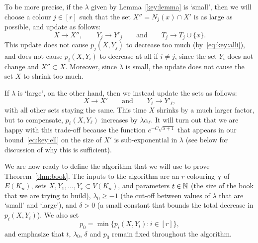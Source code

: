 To be more precise, if the $\lambda$ given by Lemma~\ref{key:lemma} is `small', then we will choose a colour $j \in [r]$ such that the set $X'' = N_j(x) \cap X'$ is as large as possible, and update as follows:
$$X \to X'', \qquad Y_j \to Y'_j \qquad \text{and} \qquad T_j \to T_j \cup \{x\}.$$
This update does not cause $p_j(X,Y_j)$ to decrease too much (by~\eqref{eq:key:alli}), and does not cause $p_i(X,Y_i)$ to decrease at all if $i \ne j$, since the set $Y_i$ does not change and $X'' \subset X$. Moreover, since $\lambda$ is small, the update does not cause the set $X$ to shrink too much. 

If $\lambda$ is `large', on the other hand, then we instead update the sets as follows:
$$X \to X' \qquad \text{and} \qquad Y_\ell \to Y'_\ell,$$
with all other sets staying the same. This time $X$ shrinks by a much larger factor, but to compensate, $p_\ell(X,Y_\ell)$ increases by $\lambda \alpha_\ell$. It will turn out that we are happy with this trade-off because the function $e^{- C \sqrt{\lambda + 1}}$ that appears in our bound~\eqref{eq:key:ell} on the size of $X'$ is sub-exponential in $\lambda$ (see below for discussion of why this is sufficient). 

We are now ready to define the algorithm that we will use to prove Theorem~\ref{thm:book}. The inputs to the algorithm are an $r$-colouring $\chi$ of $E(K_n)$, %
sets $X,Y_1,\ldots, Y_r \subset V(K_n)$, and parameters $t \in \mathbb{N}$ (the size of the book that we are trying to build), $\lambda_0 \ge -1$ (the cut-off between values of $\lambda$ that are `small' and `large'), and $\delta > 0$ (a small constant that bounds the total decrease in $p_i(X,Y_i)$). We also set  
$$p_0 = \min\big\{ p_i(X,Y_i) : i \in [r] \big\},$$
and emphasize that $t$, $\lambda_0$, $\delta$ and $p_0$ remain fixed throughout the algorithm. 

